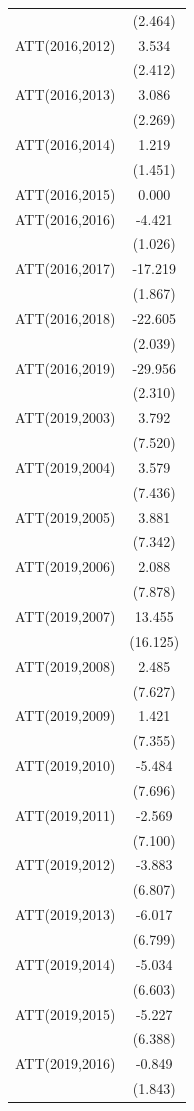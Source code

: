 \documentclass[
  12pt,
]{article}
\begin{document}
\begin{table}
\begin{tabular}[t]{lc}
 & (2.464)\\
ATT(2016,2012) & 3.534\\
 & (2.412)\\
ATT(2016,2013) & 3.086\\
 & (2.269)\\
ATT(2016,2014) & 1.219\\
 & (1.451)\\
ATT(2016,2015) & 0.000\\
ATT(2016,2016) & -4.421\\
 & (1.026)\\
ATT(2016,2017) & -17.219\\
 & (1.867)\\
ATT(2016,2018) & -22.605\\
 & (2.039)\\
ATT(2016,2019) & -29.956\\
 & (2.310)\\
ATT(2019,2003) & 3.792\\
 & (7.520)\\
ATT(2019,2004) & 3.579\\
 & (7.436)\\
ATT(2019,2005) & 3.881\\
 & (7.342)\\
ATT(2019,2006) & 2.088\\
 & (7.878)\\
ATT(2019,2007) & 13.455\\
 & (16.125)\\
ATT(2019,2008) & 2.485\\
 & (7.627)\\
ATT(2019,2009) & 1.421\\
 & (7.355)\\
ATT(2019,2010) & -5.484\\
 & (7.696)\\
ATT(2019,2011) & -2.569\\
 & (7.100)\\
ATT(2019,2012) & -3.883\\
 & (6.807)\\
ATT(2019,2013) & -6.017\\
 & (6.799)\\
ATT(2019,2014) & -5.034\\
 & (6.603)\\
ATT(2019,2015) & -5.227\\
 & (6.388)\\
ATT(2019,2016) & -0.849\\
 & (1.843)\\

\end{tabular}
\end{table}
\end{document}
